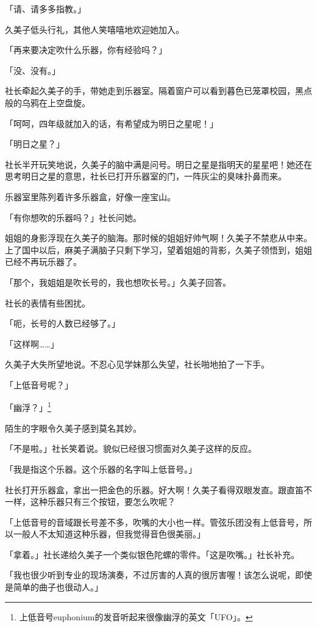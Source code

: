\documentclass[UTF8]{ctexart}
\begin{document}
    「请、请多多指教。」 

    久美子低头行礼，其他人笑嘻嘻地欢迎她加入。 

    「再来要决定吹什么乐器，你有经验吗？」 

    「没、没有。」 

    社长牵起久美子的手，带她走到乐器室。隔着窗户可以看到暮色已笼罩校园，黑点般的乌鸦在上空盘旋。 

    「呵呵，四年级就加入的话，有希望成为明日之星呢！」 

    「明日之星？」 

    社长半开玩笑地说，久美子的脑中满是问号。明日之星是指明天的星星吧！她还在思考明日之星的意思，社长已打开乐器室的门，一阵灰尘的臭味扑鼻而来。 

    乐器室里陈列着许多乐器盒，好像一座宝山。 

    「有你想吹的乐器吗？」社长问她。 

    姐姐的身影浮现在久美子的脑海。那时候的姐姐好帅气啊！久美子不禁悲从中来。上了国中以后，麻美子满脑子只剩下学习，望着姐姐的背影，久美子领悟到，姐姐已经不再玩乐器了。 

    「那个，我姐姐是吹长号的，我也想吹长号。」久美子回答。 

    社长的表情有些困扰。 

    「呃，长号的人数已经够了。」 

    「这样啊……」 

    久美子大失所望地说。不忍心见学妹那么失望，社长啪地拍了一下手。 

    「上低音号呢？」 

    「幽浮？」\footnote{上低音号euphonium的发音听起来很像幽浮的英文「UFO」。}

    陌生的字眼令久美子感到莫名其妙。 

    「不是啦。」社长笑着说。貌似已经很习惯面对久美子这样的反应。 

    「我是指这个乐器。这个乐器的名字叫上低音号。」 

    社长打开乐器盒，拿出一把金色的乐器。好大啊！久美子看得双眼发直。跟直笛不一样，这种乐器只有三个按钮，要怎么吹呢？ 

    「上低音号的音域跟长号差不多，吹嘴的大小也一样。管弦乐团没有上低音号，所以一般人不太知道这种乐器，但我觉得音色很美丽。」 

    「拿着。」社长递给久美子一个类似银色陀螺的零件。「这是吹嘴。」社长补充。 

    「我也很少听到专业的现场演奏，不过厉害的人真的很厉害喔！该怎么说呢，即使是简单的曲子也很动人。」 
\end{document}
